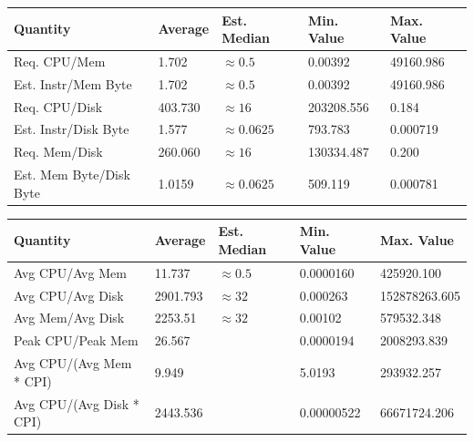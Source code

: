 \documentclass[a0,portrait]{a0poster}
\begin{document}
\begin{multicols}{2}
\begin{center}\vspace{1cm}
\begin{tabular}{| l | l l l l |} 
\toprule
\textbf{Quantity} & \textbf{Average} & \textbf{Est. Median} & \textbf{Min. Value} & \textbf{Max. Value} \\
\midrule
Req. CPU/Mem & 1.702 &  $\approx 0.5$ & 0.00392 & 49160.986  \\ \hline
Est. Instr/Mem Byte & 1.702 & $\approx 0.5 $ & 0.00392 & 49160.986 \\ \hline
Req. CPU/Disk & 403.730 & $\approx 16$ & 203208.556 & 0.184 \\ \hline
Est. Instr/Disk Byte & 1.577 & $\approx 0.0625$ & 793.783 & 0.000719 \\ \hline
Req. Mem/Disk & 260.060 & $\approx 16$ & 130334.487 & 0.200 \\ \hline
Est. Mem Byte/Disk Byte & 1.0159&  $\approx 0.0625$ & 509.119 & 0.000781 \\ \hline
\bottomrule
\end{tabular}
\end{center}\vspace{1cm}

\begin{center}\vspace{1cm}
\begin{tabular}{| l | l l l l |} 
\toprule
\textbf{Quantity} & \textbf{Average} & \textbf{Est. Median} & \textbf{Min. Value} & \textbf{Max. Value} \\
\midrule
Avg CPU/Avg Mem & 11.737 & $\approx 0.5$ & 0.0000160 & 425920.100  \\ 
Avg CPU/Avg Disk & 2901.793 & $\approx 32$ & 0.000263 & 152878263.605 \\ 
Avg Mem/Avg Disk & 2253.51 & $\approx 32$ & 0.00102 & 579532.348 \\ 
Peak CPU/Peak Mem & 26.567 & & 0.0000194 & 2008293.839 \\ 
Avg CPU/(Avg Mem * CPI) & 9.949 & & 5.0193 & 293932.257 \\ 
Avg CPU/(Avg Disk * CPI) & 2443.536 & & 0.00000522 & 66671724.206 \\ 
\bottomrule
\end{tabular}
\end{center}\vspace{1cm}


\end{multicols}
\end{document}
